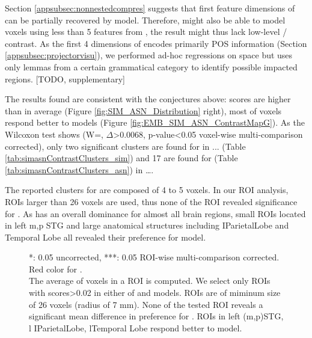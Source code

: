 

Section \ref{appsubsec:nonnestedcompres} suggests that first feature dimensions of  can be partially recovered by  model. Therefore,  might also be able to model voxels using less than 5 features from , the result might thus lack low-level / contrast. As the first 4 dimensions of  encodes primarily POS information (Section \ref{appsubsec:projectorvisu}), we performed ad-hoc regressions on  space but uses only lemmas from a certain grammatical category to identify possible impacted regions. [TODO, supplementary]

The results found are consistent with the conjectures above:  scores are higher than  in average (Figure \ref{fig:SIM_ASN_Distribution} right), most of voxels respond better to  models (Figure \ref{fig:EMB_SIM_ASN_ContrastMapG}). As the Wilcoxon test shows (W=, \(\Delta\)>0.0068, p-value<0.05 voxel-wise multi-comparison corrected), only two significant clusters are found for  in ... (Table \ref{tab:simasnContrastClusters_sim}) and 17 are found for  (Table \ref{tab:simasnContrastClusters_asn}) in \dots.

The reported clusters for  are composed of 4 to 5 voxels. In our ROI analysis, ROIs larger than 26 voxels are used, thus none of the ROI revealed significance for . As  has an overall dominance for almost all brain regions, small ROIs located in left m,p STG and large anatomical structures including IParietalLobe and Temporal Lobe all revealed their preference for  model. 

\begin{figure}
    \centering
    \caption[  ROI Contrast, Group]{*: 0.05 uncorrected, ***: 0.05 ROI-wise multi-comparison corrected. Red color for .\\ The average  of voxels in a ROI is computed. We select only ROIs with scores>0.02 in either of  and  models. ROIs are of miminum size of 26 voxels (radius of 7 mm). None of the tested ROI reveals a significant mean difference in preference for . ROIs in left (m,p)STG, l IParietalLobe, lTemporal Lobe respond better to  model.} 
    \label{fig:SIG_ASN_ROI}
\end{figure}

